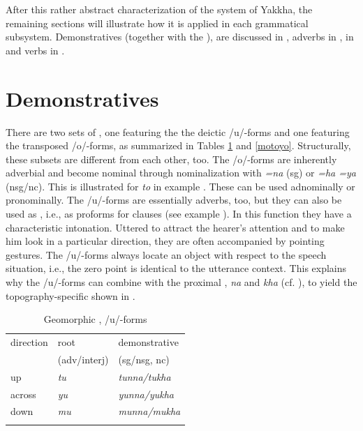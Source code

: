 After this rather abstract characterization of the  system of Yakkha, the remaining sections will illustrate how it is applied in each grammatical subsystem. Demonstratives (together with the ), are discussed in , adverbs in  ,   in  and verbs in .



\section{Demonstratives}\label{dem-pron-2}	

There are two sets of , one featuring the the deictic /u/-forms and one featuring the transposed /o/-forms, as summarized in Tables \ref{mutuyu} and \ref{motoyo}. Structurally, these subsets are different from each other, too.  The /o/-forms are inherently adverbial and become nominal through nominalization with \emph{=na} ({\sc sg}) or \emph{=ha \ti =ya} ({\sc nsg/nc}). This is illustrated for \emph{to} in example \Next. These  can be used adnominally or pronominally. 
The /u/-forms are  essentially adverbs, too, but they can also be used as , i.e., as proforms for clauses (see example \NNext). In this function they have a characteristic intonation. Uttered to attract the hearer's attention and to make him look in a particular direction, they are often accompanied by pointing gestures. The /u/-forms always locate an object with respect to the speech situation, i.e., the zero point is identical to the utterance context. This explains why the /u/-forms can combine with the proximal , \emph{na} and \emph{kha} (cf. ),  to yield the topography-specific  shown in . 

\begin{table}[htp]
\begin{centering}
\begin{tabular}{lll}
\lsptoprule
 {\sc direction} & {\sc root} & {\sc demonstrative}  \\
  & {\sc   ({\sc adv/interj})} & ({\sc sg/nsg, nc})\\
\midrule
{\sc up}&\emph{tu} &\emph{tunna/tukha}\\
{\sc across } &\emph{yu} &\emph{yunna/yukha}\\
{\sc down}&\emph{mu} &\emph{munna/mukha}\\
\lspbottomrule
\end{tabular}\\
\caption{Geomorphic ,  /u/-forms} \label{mutuyu}
\end{centering}
\end{table}


